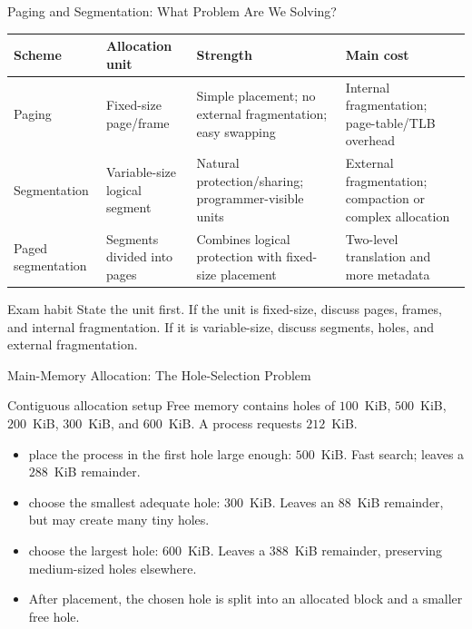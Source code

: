 \documentclass[aspectratio=169]{beamer}
\begin{document}
\begin{frame}{Paging and Segmentation: What Problem Are We Solving?}
  \scriptsize
  \begin{center}
    \begin{tabular}{@{}p{2.2cm}p{3.6cm}p{3.6cm}p{2.8cm}@{}}
      \toprule
      \textbf{Scheme} & \textbf{Allocation unit} & \textbf{Strength} & \textbf{Main cost} \\
      \midrule
      Paging & Fixed-size page/frame & Simple placement; no external fragmentation; easy swapping & Internal fragmentation; page-table/\-TLB overhead \\
      Segmentation & Variable-size logical segment & Natural protection/sharing; programmer-visible units & External fragmentation; compaction or complex allocation \\
      Paged segmentation & Segments divided into pages & Combines logical protection with fixed-size placement & Two-level translation and more metadata \\
      \bottomrule
    \end{tabular}
  \end{center}
  \vspace{0.15cm}
  \begin{alertblock}{Exam habit}
    State the unit first. If the unit is fixed-size, discuss pages, frames, and
    internal fragmentation. If it is variable-size, discuss segments, holes,
    and external fragmentation.
  \end{alertblock}
\end{frame}

\begin{frame}{Main-Memory Allocation: The Hole-Selection Problem}
  \begin{exampleblock}{Contiguous allocation setup}
    Free memory contains holes of $100$~KiB, $500$~KiB, $200$~KiB, $300$~KiB,
    and $600$~KiB. A process requests $212$~KiB.
  \end{exampleblock}
  \begin{itemize}
    \item {} place the process in the first hole large enough:
      $500$~KiB. Fast search; leaves a $288$~KiB remainder.
    \item {} choose the smallest adequate hole: $300$~KiB.
      Leaves an $88$~KiB remainder, but may create many tiny holes.
    \item {} choose the largest hole: $600$~KiB. Leaves a
      $388$~KiB remainder, preserving medium-sized holes elsewhere.
    \item After placement, the chosen hole is split into an allocated block and
      a smaller free hole.
  \end{itemize}
\end{frame}
\end{document}
